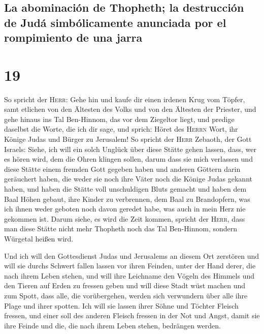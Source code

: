 \hypertarget{la-abominaciuxf3n-de-thopheth-la-destrucciuxf3n-de-juduxe1-simbuxf3licamente-anunciada-por-el-rompimiento-de-una-jarra}{%
\subsection{La abominación de Thopheth; la destrucción de Judá
simbólicamente anunciada por el rompimiento de una
jarra}\label{la-abominaciuxf3n-de-thopheth-la-destrucciuxf3n-de-juduxe1-simbuxf3licamente-anunciada-por-el-rompimiento-de-una-jarra}}

\hypertarget{section-18}{%
\section{19}\label{section-18}}

 So spricht der \textsc{Herr}: Gehe hin und kaufe dir
einen irdenen Krug vom Töpfer, samt etlichen von den Ältesten des Volks
und von den Ältesten der Priester,  und gehe hinaus ins
Tal Ben-Hinnom, das vor dem Ziegeltor liegt, und predige daselbst die
Worte, die ich dir sage,  und sprich: Höret des
\textsc{Herrn} Wort, ihr Könige Judas und Bürger zu Jerusalem! So
spricht der \textsc{Herr} Zebaoth, der Gott Israels: Siehe, ich will ein
solch Unglück über diese Stätte gehen lassen, dass, wer es hören wird,
dem die Ohren klingen sollen,  darum dass sie mich
verlassen und diese Stätte einem fremden Gott gegeben haben und anderen
Göttern darin geräuchert haben, die weder sie noch ihre Väter noch die
Könige Judas gekannt haben, und haben die Stätte voll unschuldigen Bluts
gemacht  und haben dem Baal Höhen gebaut, ihre Kinder zu
verbrennen, dem Baal zu Brandopfern, was ich ihnen weder geboten noch
davon geredet habe, was auch in mein Herz nie gekommen ist.
 Darum siehe, es wird die Zeit kommen, spricht der
\textsc{Herr}, dass man diese Stätte nicht mehr Thopheth noch das Tal
Ben-Hinnom, sondern Würgetal heißen wird.

 Und ich will den Gottesdienst Judas und Jerusalems an
diesem Ort zerstören und will sie durchs Schwert fallen lassen vor ihren
Feinden, unter der Hand derer, die nach ihrem Leben stehen, und will
ihre Leichname den Vögeln des Himmels und den Tieren auf Erden zu
fressen geben  und will diese Stadt wüst machen und zum
Spott, dass alle, die vorübergehen, werden sich verwundern über alle
ihre Plage und ihrer spotten.  Ich will sie lassen ihrer
Söhne und Töchter Fleisch fressen, und einer soll des anderen Fleisch
fressen in der Not und Angst, damit sie ihre Feinde und die, die nach
ihrem Leben stehen, bedrängen werden.

